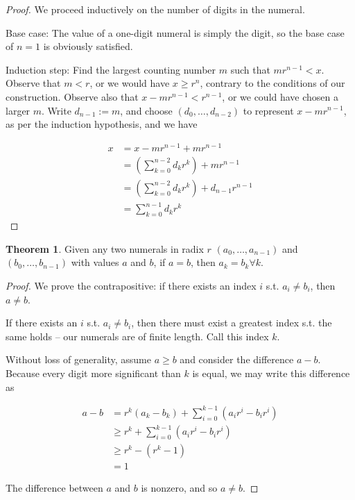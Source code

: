 \documentclass[12pt]{article}
\theoremstyle{definition}
\newtheorem{theorem}{Theorem}[section]
\begin{document}
\begin{proof}
  We proceed inductively on the number of digits in the numeral.

  Base case: The value of a one-digit numeral is simply
  the digit, so the base case of $n=1$ is obviously satisfied.

  Induction step: Find the largest counting number $m$ such that $m
r^{n-1} < x$. Observe that $m < r$, or we would have $x \geq r^n$, contrary to the
conditions of our construction. Observe also that $x - mr^{n-1} < r^{n-1}$, or
we could have chosen a larger $m$. Write $d_{n-1} := m$, and choose
$(d_{0},\ldots,d_{n-2})$ to represent $x- mr^{n-1}$, as per the induction hypothesis, and we have

\begin{align*}
  x &= x - mr^{n-1} + mr^{n-1} \\
    &= \left( \sum_{k=0}^{n-2} d_kr^k \right) + mr^{n-1}\\
    &= \left( \sum_{k=0}^{n-2} d_kr^k \right) + d_{n-1}r^{n-1}\\
    &= \sum_{k=0}^{n-1} d_kr^k
\end{align*}
\end{proof}

\begin{theorem}
  Given any two numerals in radix $r$ $(a_0,\ldots,a_{n-1})$ and $(b_0,\ldots,
b_{n-1})$ with values $a$ and $b$, if $a = b$, then $a_k = b_k\forall k$.
\end{theorem}

\begin{proof}
  We prove the contrapositive: if there exists an index $i$ s.t. $a_i \neq b_i$,
  then $a \neq b$.

  If there exists an $i$ s.t. $a_i \neq b_i$, then there must exist a greatest index
  s.t. the same holds -- our numerals are of finite length. Call this index $k$.

  Without loss of generality, assume $a \geq b$ and consider the difference
$a-b$. Because every digit more significant than $k$ is equal, we may write this
difference as

\begin{align*}
  a - b &= r^k(a_k - b_k) + \sum_{i=0}^{k-1} \left( a_ir^i - b_ir^i \right)\\
        &\geq r^k + \sum_{i=0}^{k-1} \left( a_ir^i - b_ir^i \right)\\
        &\geq r^k - (r^k - 1)\\
        &= 1
\end{align*}

The difference between $a$ and $b$ is nonzero, and so $a \neq b$.
\end{proof}
\end{document}
